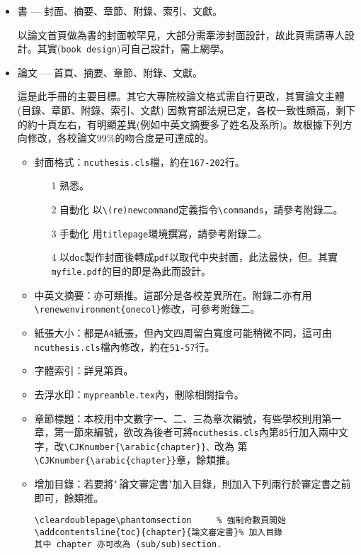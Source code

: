 \begin{itemize}
\item 書 --- 封面、摘要、章節、附錄、索引、文獻。

以論文首頁做為書的封面較罕見，大部分需牽涉封面設計，故此頁需請專人設計。其實({\tt book design})可自己設計，需上網學。

\item 論文 --- 首頁、摘要、章節、附錄、文獻。

這是此手冊的主要目標。其它大專院校論文格式需自行更改，其實論文主體(目錄、章節、附錄、索引、文獻) 因教育部法規已定，各校一致性頗高，剩下的約十頁左右，有明顯差異(例如中英文摘要多了姓名及系所)。故根據下列方向修改，各校論文99\%的吻合度是可達成的。
\begin{itemize}
\item 封面格式：{\tt ncuthesis.cls}檔，約在{\tt 167-202}行。
\begin{itemize}
\item [1] 熟悉。
\item [2]  自動化  以{\tt \textbackslash (re)newcommand}定義指令{\tt \textbackslash commands}，請參考附錄二。

\item [3] 手動化 用{\tt titlepage}環境撰寫，請參考附錄二。

\item [4] 以{\tt doc}製作封面後轉成{\tt pdf}以取代中央封面，此法最快，但。其實{\tt myfile.pdf}的目的即是為此而設計。
\end{itemize}
\item 中英文摘要：亦可類推。這部分是各校差異所在。附錄二亦有用\verb|\renewenvironment{onecol}|修改，可參考附錄二。

\item 紙張大小：都是{\tt A4}紙張，但內文四周留白寬度可能稍微不同，這可由{\tt ncuthesis.cls}檔內修改，約在{\tt 51-57}行。
\item 字體索引：詳見第\fbox{\pageref{indpage}}頁。
\item 去浮水印：{\tt mypreamble.tex}內，刪除相關指令。
\item 章節標題：本校用中文數字一、二、三為章次編號，有些學校則用第一章，第一節來編號，欲改為後者可將{\tt ncuthesis.cls}內第{\tt 85}行加入兩中文字，改\verb|\CJKnumber{\arabic{chapter}}、|改為
{\color{red}第}\verb|\CJKnumber{\arabic{chapter}}|{\color{red}章}，餘類推。
\item 增加目錄：若要將"\,論文審定書"加入目錄，則加入下列兩行於審定書之前即可，餘類推。
\begin{verbatim}
\cleardoublepage\phantomsection     % 強制奇數頁開始
\addcontentsline{toc}{chapter}{論文審定書}% 加入目錄
其中 chapter 亦可改為 (sub/sub)section.
\end{verbatim}
\end{itemize}


\end{itemize}
